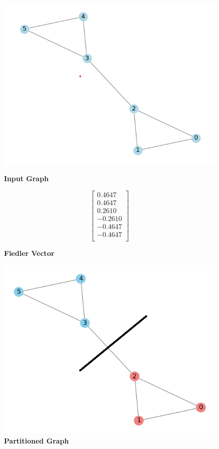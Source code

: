 \documentclass[hidelinks,12pt]{article}
\begin{document}
\begin{figure}[h!]
\centering

\begin{minipage}[c]{0.33\textwidth}
    \centering

    \includegraphics[width=\linewidth]{figures/image00.png}
    \caption*{\textbf{Input Graph}}
\end{minipage}%
\hfill
\begin{minipage}[c]{0.28\textwidth}
    \centering
    \[
    \begin{bmatrix}
    0.4647 \\
    0.4647 \\
    0.2610 \\
    -0.2610 \\
    -0.4647 \\
    -0.4647 \\
    \end{bmatrix}
    \]
    \caption*{\textbf{Fiedler Vector}}
\end{minipage}%
\hfill
\begin{minipage}[c]{0.33\textwidth}
    \centering
    \includegraphics[width=\linewidth]{figures/image01.png}
    \caption*{\textbf{Partitioned Graph}}
\end{minipage}
\end{figure}
\newpage
\end{document}

